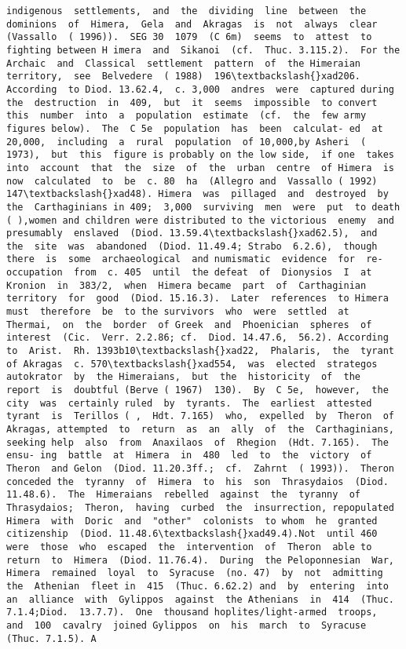 \documentclass[11pt]{article}
\begin{document}
\begin{Verbatim}[commandchars=\\\{\}]
indigenous  settlements,  and  the  dividing  line  between  the dominions  of  Himera,  Gela  and  Akragas  is  not  always  clear (Vassallo  ( 1996)).  SEG 30  1079  (C 6m)  seems  to  attest  to fighting between H imera  and  Sikanoi  (cf.  Thuc. 3.115.2).  For the  Archaic  and  Classical  settlement  pattern  of  the Himeraian  territory,  see  Belvedere  ( 1988)  196\textbackslash{}xad206. According  to Diod. 13.62.4,  c. 3,000  andres  were  captured during  the  destruction  in  409,  but  it  seems  impossible  to convert  this  number  into  a  population  estimate  (cf.  the  few army  figures below).  The  C 5e  population  has  been  calculat- ed  at  20,000,  including  a  rural  population  of 10,000,by Asheri  ( 1973),  but  this  figure is probably on the low side,  if one  takes  into  account  that  the  size  of  the  urban  centre  of Himera  is  now  calculated  to  be  c. 80  ha  (Allegro and  Vassallo ( 1992)  147\textbackslash{}xad48). Himera  was  pillaged  and  destroyed  by  the  Carthaginians in 409;  3,000  surviving  men  were  put  to death ( ),women and children were distributed to the victorious  enemy  and  presumably  enslaved  (Diod. 13.59.4\textbackslash{}xad62.5),  and  the  site  was  abandoned  (Diod. 11.49.4; Strabo  6.2.6),  though  there  is  some  archaeological  and numismatic  evidence  for  re-occupation  from  c. 405  until  the defeat  of  Dionysios  I  at  Kronion  in  383/2,  when  Himera became  part  of  Carthaginian  territory  for  good  (Diod. 15.16.3).  Later  references  to Himera  must  therefore  be  to the survivors  who  were  settled  at  Thermai,  on  the  border  of Greek  and  Phoenician  spheres  of  interest  (Cic.  Verr. 2.2.86; cf.  Diod. 14.47.6,  56.2). According  to  Arist.  Rh. 1393b10\textbackslash{}xad22,  Phalaris,  the  tyrant  of Akragas  c. 570\textbackslash{}xad554,  was  elected  strategos  autokrator  by  the Himeraians,  but  the  historicity  of  the  report  is  doubtful (Berve ( 1967)  130).  By  C 5e,  however,  the  city  was  certainly ruled  by  tyrants.  The  earliest  attested  tyrant  is  Terillos ( ,  Hdt. 7.165)  who,  expelled  by  Theron  of  Akragas, attempted  to  return  as  an  ally  of  the  Carthaginians,  seeking help  also  from  Anaxilaos  of  Rhegion  (Hdt. 7.165).  The  ensu- ing  battle  at  Himera  in  480  led  to  the  victory  of  Theron  and Gelon  (Diod. 11.20.3ff.;  cf.  Zahrnt  ( 1993)).  Theron  conceded the  tyranny  of  Himera  to  his  son  Thrasydaios  (Diod. 11.48.6).  The  Himeraians  rebelled  against  the  tyranny  of Thrasydaios;  Theron,  having  curbed  the  insurrection, repopulated  Himera  with  Doric  and  "other"  colonists  to whom  he  granted  citizenship  (Diod. 11.48.6\textbackslash{}xad49.4).Not  until 460  were  those  who  escaped  the  intervention  of  Theron  able to  return  to  Himera  (Diod. 11.76.4).  During  the Peloponnesian  War,  Himera  remained  loyal  to  Syracuse  (no. 47)  by  not  admitting  the  Athenian  fleet in  415  (Thuc. 6.62.2) and  by  entering  into  an  alliance  with  Gylippos  against  the Athenians  in  414  (Thuc. 7.1.4;Diod.  13.7.7).  One  thousand hoplites/light-armed  troops,  and  100  cavalry  joined Gylippos  on  his  march  to  Syracuse  (Thuc. 7.1.5). A  
\end{Verbatim}
\end{document}
